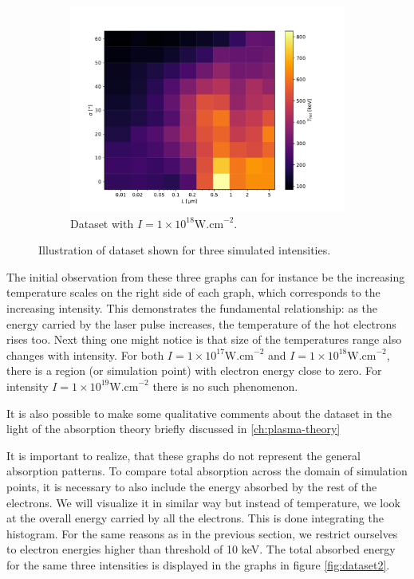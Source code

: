 \begin{figure}[ht]
\begin{subfigure}{0.49\textwidth}
		\centering
		\includegraphics[width=\textwidth]{figures/I_1e19t_hot}
		\caption{Dataset with $I = 1 \times 10^{18} \mathrm{W.cm}^{-2}$.}
		\label{fig:dataset1-c}
	\end{subfigure}
	\caption{Illustration of dataset shown for three simulated intensities.}
	\label{fig:dataset1}
\end{figure}

The initial observation from these three graphs can for instance be the increasing temperature scales on the right side of each graph, which corresponds to the increasing intensity. This demonstrates the fundamental relationship: as the energy carried by the laser pulse increases, the temperature of the hot electrons rises too. Next thing one might notice is that size of the temperatures range also changes with intensity. For both $I = 1 \times 10^{17} \mathrm{W.cm}^{-2}$ and $I = 1 \times 10^{18} \mathrm{W.cm}^{-2}$, there is a region (or simulation point) with electron energy close to zero. For intensity $I = 1 \times 10^{19} \mathrm{W.cm}^{-2}$ there is no such phenomenon. 

It is also possible to make some qualitative comments about the dataset in the light of the absorption theory briefly discussed in \ref{ch:plasma-theory}

It is important to realize, that these graphs do not represent the general absorption patterns. To compare total absorption across the domain of simulation points, it is necessary to also include the energy absorbed by the rest of the electrons. We will visualize it in similar way but instead of temperature, we look at the overall energy carried by all the electrons. This is done integrating the histogram. For the same reasons as in the previous section, we restrict ourselves to electron energies higher than threshold of 10 keV. The total absorbed energy for the same three intensities is displayed in the graphs in figure \ref{fig:dataset2}.

